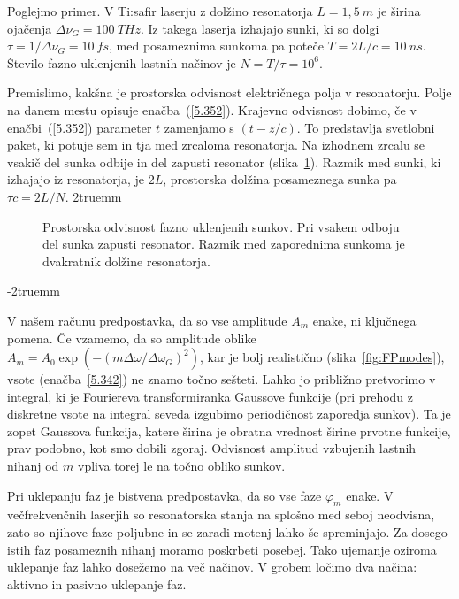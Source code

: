 Poglejmo primer. V Ti:safir laserju z dolžino resonatorja $L=1,5~\si{m}$ je 
širina ojačenja $\Delta \nu_G = 100~\si{THz}$. Iz takega laserja izhajajo
sunki, ki so dolgi $\tau = 1/\Delta \nu_G = 10~\si{fs}$, med posameznima sunkoma pa
poteče $T = 2L/c = 10~\si{ns}$. Število fazno uklenjenih lastnih načinov je 
$N = T/\tau = 10^6$.

Premislimo, kakšna je prostorska odvisnost električnega polja v
resonatorju. Polje na danem mestu opisuje enačba~(\ref{5.352}). Krajevno 
odvisnost dobimo, če v enačbi~(\ref{5.352}) parameter $t$ zamenjamo s $(t-z/c)$. To
predstavlja svetlobni paket, ki potuje sem in tja med zrcaloma
resonatorja. Na izhodnem zrcalu se vsakič del sunka odbije in del zapusti
resonator (slika~\ref{fig.5.11}). Razmik med sunki, ki izhajajo iz
resonatorja, je $2L$, prostorska dolžina posameznega sunka pa $\tau c=2L/N$.
\vglue2truemm

\begin{figure}[ht]
\centering
\def\svgwidth{120truemm} 

\caption{Prostorska odvisnost fazno uklenjenih sunkov. Pri vsakem odboju del
sunka zapusti resonator. Razmik med zaporednima sunkoma je dvakratnik dolžine resonatorja.}
\label{fig.5.11}
\end{figure}
\vglue-2truemm
\begin{remark}
V našem računu predpostavka, da so vse amplitude $A_{m}$ enake, ni ključnega 
pomena. Če vzamemo, da so amplitude oblike 
$A_{m}=A_{0}\exp (-(m\Delta \omega /\Delta \omega_{G})^{2})$, 
kar je bolj realistično (slika~\ref{fig:FPmodes}), vsote (enačba~\ref{5.342}) 
ne znamo točno sešteti. Lahko jo
približno pretvorimo v integral, ki je Fouriereva transformiranka Gaussove
funkcije (pri prehodu z diskretne vsote na integral seveda izgubimo
periodičnost zaporedja sunkov). Ta je zopet Gaussova funkcija, katere
širina je obratna vrednost širine prvotne funkcije, prav podobno, kot
smo dobili zgoraj. Odvisnost amplitud vzbujenih lastnih nihanj od $m$ 
vpliva torej le na točno obliko sunkov.
\end{remark}
Pri uklepanju faz je bistvena predpostavka, da so vse faze $\varphi_m$ enake. 
V večfrekvenčnih laserjih so resonatorska stanja na splošno med seboj
neodvisna, zato so njihove faze poljubne in se zaradi motenj lahko še spreminjajo.
Za dosego istih faz posameznih nihanj moramo poskrbeti posebej. Tako ujemanje
oziroma uklepanje faz lahko dosežemo na več načinov. V grobem ločimo dva načina:
aktivno in pasivno uklepanje faz.

